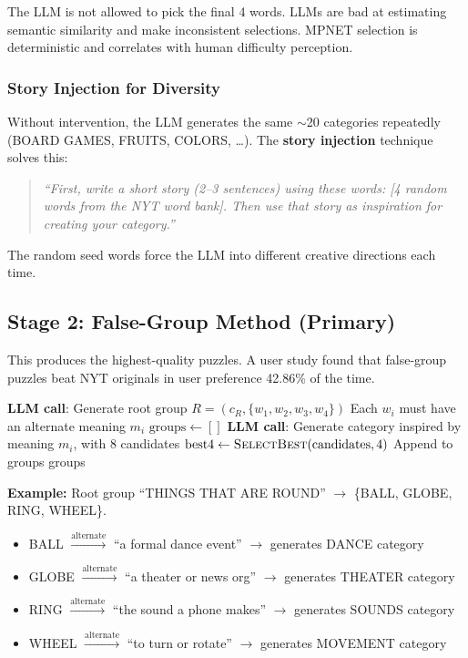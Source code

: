 \documentclass[11pt, letterpaper]{article}
\begin{document}
\begin{keyidea}
The LLM is not allowed to pick the final 4 words. LLMs are bad at estimating semantic similarity and make inconsistent selections. MPNET selection is deterministic and correlates with human difficulty perception.
\end{keyidea}

\subsubsection{Story Injection for Diversity}

Without intervention, the LLM generates the same $\sim$20 categories repeatedly (BOARD GAMES, FRUITS, COLORS, \ldots). The \textbf{story injection} technique solves this:

\begin{quote}
\emph{``First, write a short story (2--3 sentences) using these words: [4 random words from the NYT word bank]. Then use that story as inspiration for creating your category.''}
\end{quote}

The random seed words force the LLM into different creative directions each time.

\subsection{Stage 2: False-Group Method (Primary)}

This produces the highest-quality puzzles. A user study found that false-group puzzles beat NYT originals in user preference 42.86\% of the time.

\begin{algorithm}[H]
\caption{False-Group Pipeline}
\begin{algorithmic}[1]
\State \textbf{LLM call}: Generate root group $R = (c_R, \{w_1, w_2, w_3, w_4\})$
\State \quad Each $w_i$ must have an alternate meaning $m_i$
\State $\text{groups} \gets []$
    \State \textbf{LLM call}: Generate category inspired by meaning $m_i$, with 8 candidates
    \State $\text{best4} \gets \textsc{SelectBest}(\text{candidates}, 4)$ 
    \State Append to groups
\EndFor
\State \Return groups 
\end{algorithmic}
\end{algorithm}

\textbf{Example:} Root group ``THINGS THAT ARE ROUND'' $\rightarrow$ \{BALL, GLOBE, RING, WHEEL\}.
\begin{itemize}[nosep]
    \item BALL $\xrightarrow{\text{alternate}}$ ``a formal dance event'' $\rightarrow$ generates DANCE category
    \item GLOBE $\xrightarrow{\text{alternate}}$ ``a theater or news org'' $\rightarrow$ generates THEATER category
    \item RING $\xrightarrow{\text{alternate}}$ ``the sound a phone makes'' $\rightarrow$ generates SOUNDS category
    \item WHEEL $\xrightarrow{\text{alternate}}$ ``to turn or rotate'' $\rightarrow$ generates MOVEMENT category
\end{itemize}
\end{document}

